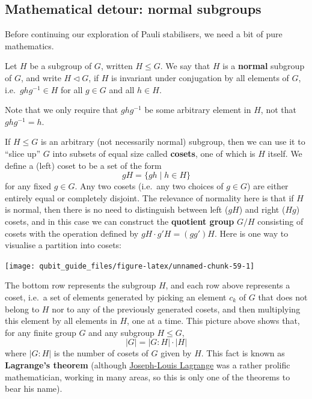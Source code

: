 \documentclass[fleqn,a4paper]{article}
\theoremstyle{definition}
\theoremstyle{definition}
\theoremstyle{definition}
\theoremstyle{definition}
\theoremstyle{remark}
\begin{document}
\hypertarget{mathematical-detour-normal-subgroups}{%
\subsection{Mathematical detour: normal subgroups}\label{mathematical-detour-normal-subgroups}}

Before continuing our exploration of Pauli stabilisers, we need a bit of pure mathematics.

Let \(H\) be a subgroup of \(G\), written \(H\leqslant G\).
We say that \(H\) is a \textbf{normal} subgroup of \(G\), and write \(H\triangleleft G\), if \(H\) is invariant under conjugation by all elements of \(G\), i.e.~\(ghg^{-1}\in H\) for all \(g\in G\) and all \(h\in H\).

Note that we only require that \(ghg^{-1}\) be some arbitrary element in \(H\), not that \(ghg^{-1}=h\).

If \(H\leqslant G\) is an arbitrary (not necessarily normal) subgroup, then we can use it to ``slice up'' \(G\) into subsets of equal size called \textbf{cosets}, one of which is \(H\) itself.
We define a (left) coset to be a set of the form
\[
  gH = \{gh \mid h\in H\}
\]
for any fixed \(g\in G\).
Any two cosets (i.e.~any two choices of \(g\in G\)) are either entirely equal or completely disjoint.
The relevance of normality here is that if \(H\) is normal, then there is no need to distinguish between left (\(gH\)) and right (\(Hg\)) cosets, and in this case we can construct the \textbf{quotient group} \(G/H\) consisting of cosets with the operation defined by \(gH\cdot g'H=(gg')H\).
Here is one way to visualise a partition into cosets:

\begin{center}\texttt{[image: qubit\_guide\_files/figure-latex/unnamed-chunk-59-1]} \end{center}

The bottom row represents the subgroup \(H\), and each row above represents a coset, i.e.~a set of elements generated by picking an element \(c_k\) of \(G\) that does not belong to \(H\) nor to any of the previously generated cosets, and then multiplying this element by all elements in \(H\), one at a time.
This picture above shows that, for any finite group \(G\) and any subgroup \(H\leqslant G\),
\[
  |G| = |G:H|\cdot|H|
\]
where \(|G:H|\) is the number of cosets of \(G\) given by \(H\).
This fact is known as \textbf{Lagrange's theorem} (although \href{https://en.wikipedia.org/wiki/Joseph-Louis_Lagrange}{Joseph-Louis Lagrange} was a rather prolific mathematician, working in many areas, so this is only one of the theorems to bear his name).
\end{document}
